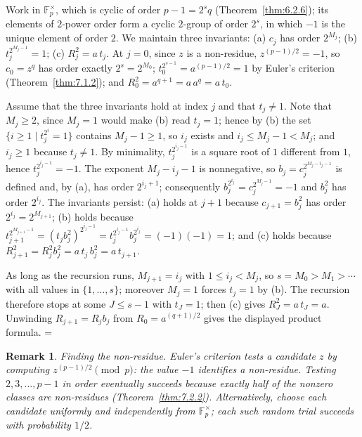 \documentclass[11pt]{article}
\makeatletter
\let\nt@closedisplay\]
\def\nt@guardedclose{\@ifnextchar\par{\nt@closeafterpar}{\@ifnextchar\end{\postdisplaypenalty\@M\nt@closedisplay}{\nt@closedisplay}}}
\def\nt@closeafterpar\par{\@ifnextchar\par{\nt@closeafterpar}{\@ifnextchar\end{\postdisplaypenalty\@M\nt@closedisplay\par}{\nt@closedisplay\par}}}
\renewenvironment{proof}[1][\proofname]{\par
  \pushQED{\qed}\normalfont\topsep\medskipamount\edef\nt@afterproof{\@endparpenalty=\the\@endparpenalty\relax}\@beginparpenalty\@M\@endparpenalty\@M\let\]\nt@guardedclose\trivlist\item[]\textit{#1\@addpunct{.}} \ignorespaces}{\ifvmode\addpenalty\@M\fi\popQED\nt@afterproof\endtrivlist\@endpefalse}
\theoremstyle{ntstyle}
\newtheorem*{remark}{Remark}
\makeatother
\begin{document}
\begin{proof} Work in $\mathbb{F}_p^{\times}$, which is cyclic of
  order $p-1=2^s q$ (Theorem~\ref{thm:6.2.6}); its elements of $2$-power order form a cyclic
  $2$-group of order $2^{s}$, in which $-1$ is the unique element of
  order $2$. We maintain three invariants: (a) $c_j$ has order $2^{M_j}$;
  (b) $t_j^{2^{M_j-1}} = 1$; (c) $R_j^{2} = a\,t_j$. At $j = 0$,
  since $z$ is a non-residue, $z^{(p-1)/2} = -1$, so $c_0 = z^{q}$ has
  order exactly $2^{s} = 2^{M_0}$; $t_0^{2^{s-1}} = a^{(p-1)/2} = 1$ by
  Euler's criterion (Theorem~\ref{thm:7.1.2}); and $R_0^{2} = a^{q+1} = a\,a^{q} = a\,t_0$.

  Assume that the three invariants hold at index $j$ and that $t_j \neq 1$. Note that $M_j \ge 2$, since $M_j = 1$
  would make (b) read $t_j = 1$; hence by (b) the
  set $\{i \ge 1 \mid t_j^{2^{i}} = 1\}$ contains $M_j - 1 \ge 1$, so $i_j$
  exists and $i_j \le M_j - 1 < M_j$; and $i_j \ge 1$ because $t_j \neq 1$. By minimality, $t_j^{2^{i_j-1}}$ is a
  square root of $1$ different
  from $1$, hence $t_j^{2^{i_j-1}} = -1$. The exponent $M_j - i_j - 1$ is
  nonnegative, so $b_j = c_j^{2^{M_j-i_j-1}}$ is defined and, by (a), has order
  $2^{i_j+1}$; consequently $b_j^{2^{i_j}} = c_j^{2^{M_j-1}} = -1$ and
  $b_j^{2}$ has order $2^{i_j}$. The invariants persist: (a) holds at $j+1$ because
  $c_{j+1} = b_j^{2}$ has order $2^{i_j} = 2^{M_{j+1}}$; (b) holds
  because $t_{j+1}^{2^{M_{j+1}-1}} = (t_jb_j^{2})^{2^{i_j-1}} = t_j^{2^{i_j-1}}b_j^{2^{i_j}} = (-1)(-1) = 1$; and
  (c) holds because
  $R_{j+1}^{2} = R_j^{2}b_j^{2} = a\,t_j\,b_j^{2} = a\,t_{j+1}$.

  As long as the recursion runs, $M_{j+1} = i_j$ with $1 \le i_j < M_j$,
  so $s = M_0 > M_1 > \cdots$ with all values in $\{1, \ldots, s\}$;
  moreover $M_j = 1$ forces $t_j = 1$ by (b). The recursion therefore
  stops at some $J \le s-1$ with $t_J = 1$; then (c) gives $R_J^{2} = a\,t_J = a$. Unwinding $R_{j+1} = R_jb_j$
  from $R_0 = a^{(q+1)/2}$ gives the displayed product formula.
\end{proof}

\begin{remark}
\textit{Finding the non-residue.}
Euler's criterion tests a candidate $z$ by computing
$z^{(p-1)/2}\pmod{p}$: the value $-1$ identifies a non-residue.
Testing $2,3,\ldots,p-1$ in order eventually succeeds because exactly
half of the nonzero classes are non-residues (Theorem~\ref{thm:7.2.2}).
Alternatively, choose each candidate uniformly and independently from
$\mathbb{F}_p^{\times}$; each such random trial succeeds with probability
$1/2$.
\end{remark}
\end{document}

